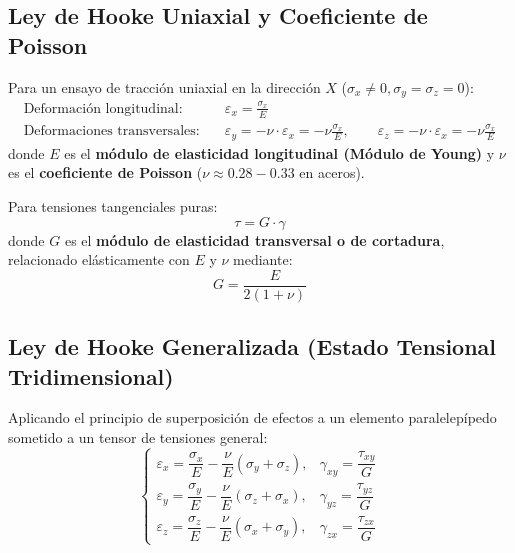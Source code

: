 \subsection{Ley de Hooke Uniaxial y Coeficiente de Poisson}
Para un ensayo de tracción uniaxial en la dirección $X$ ($\sigma_x \neq 0, \sigma_y = \sigma_z = 0$):
\begin{align}
    \text{Deformación longitudinal:}    & \quad \varepsilon_x = \frac{\sigma_x}{E}                                                                                                            \\
    \text{Deformaciones transversales:} & \quad \varepsilon_y = -\nu \cdot \varepsilon_x = -\nu \frac{\sigma_x}{E}, \qquad \varepsilon_z = -\nu \cdot \varepsilon_x = -\nu \frac{\sigma_x}{E}
\end{align}
donde $E$ es el \textbf{módulo de elasticidad longitudinal (Módulo de Young)} y $\nu$ es el \textbf{coeficiente de Poisson} ($\nu \approx 0.28 - 0.33$ en aceros).

Para tensiones tangenciales puras:
\begin{equation}
    \tau = G \cdot \gamma
\end{equation}
donde $G$ es el \textbf{módulo de elasticidad transversal o de cortadura}, relacionado elásticamente con $E$ y $\nu$ mediante:
\begin{equation}
    G = \frac{E}{2(1 + \nu)}
    \label{eq:modulo_cizalladura_G}
\end{equation}

\subsection{Ley de Hooke Generalizada (Estado Tensional Tridimensional)}
Aplicando el principio de superposición de efectos a un elemento paralelepípedo sometido a un tensor de tensiones general:
\begin{equation}
    \begin{cases}
        \varepsilon_x = \dfrac{\sigma_x}{E} - \dfrac{\nu}{E}(\sigma_y + \sigma_z), & \gamma_{xy} = \dfrac{\tau_{xy}}{G} \\[10pt]
        \varepsilon_y = \dfrac{\sigma_y}{E} - \dfrac{\nu}{E}(\sigma_z + \sigma_x), & \gamma_{yz} = \dfrac{\tau_{yz}}{G} \\[10pt]
        \varepsilon_z = \dfrac{\sigma_z}{E} - \dfrac{\nu}{E}(\sigma_x + \sigma_y), & \gamma_{zx} = \dfrac{\tau_{zx}}{G}
    \end{cases}
    \label{eq:hooke_generalizada}
\end{equation}

